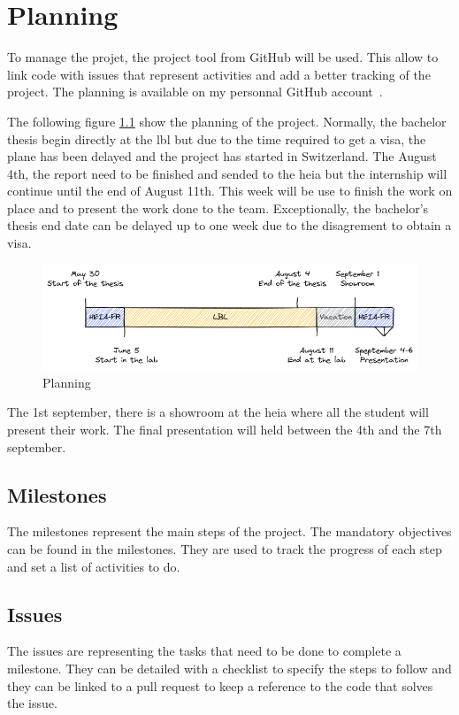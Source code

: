 \chapter{Planning}
\label{spec:ch:planning}

To manage the projet, the project tool from GitHub will be used.
This allow to link code with issues that represent activities and add a better tracking of the project.
The planning is available on my personnal GitHub account~\cite{github-project}.

The following figure \ref{spec:fig:planning} show the planning of the project.
Normally, the bachelor thesis begin directly at the \acrshort{lbl} but due to the time required to get a visa, the plane has been delayed and the project has started in Switzerland.
The August 4th, the report need to be finished and sended to the \acrshort{heia} but the internship will continue until the end of August 11th.
This week will be use to finish the work on place and to present the work done to the team.
Exceptionally, the bachelor's thesis end date can be delayed up to one week due to the disagrement to obtain a visa.

\begin{figure}[ht]
    \centering
    \includegraphics[width=\textwidth]{05-resources/img/spec/planning.excalidraw.png}
    \caption{Planning}
    \label{spec:fig:planning}
\end{figure}

The 1st september, there is a showroom at the \acrshort{heia} where all the student will present their work.
The final presentation will held between the 4th and the 7th september.

\section{Milestones}
\label{spec:ch:planning:milestones}

The milestones represent the main steps of the project.
The mandatory objectives can be found in the milestones.
They are used to track the progress of each step and set a list of activities to do.


\section{Issues}
\label{spec:ch:planning:issues}

The issues are representing the tasks that need to be done to complete a milestone.
They can be detailed with a checklist to specify the steps to follow and they can be linked to a pull request to keep a reference to the code that solves the issue.


